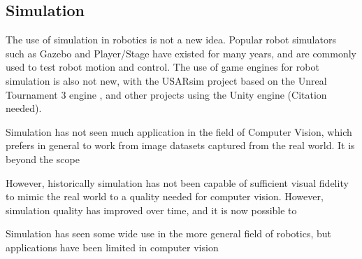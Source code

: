 
\subsection{Simulation}

The use of simulation in robotics is not a new idea.
Popular robot simulators such as Gazebo \cite{Koenig2004} and Player/Stage \cite{Gerkey2003} have existed for many years, and are commonly used to test robot motion and control. The use of game engines for robot simulation is also not new, with the USARsim project based on the Unreal Tournament 3 engine \cite{Carpin2007}, and other projects using the Unity engine (Citation needed).

Simulation has not seen  much application in the field of Computer Vision, which prefers in general to work from image datasets captured from the real world. It is beyond the scope 

However, historically simulation has not been capable of sufficient visual fidelity to mimic the real world to a quality needed for computer vision. However, simulation quality has improved over time, and it is now possible to 

Simulation has seen some wide use in the more general field of robotics, but applications have been limited in computer vision

